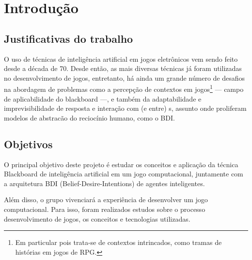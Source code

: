 \chapter{Introdução}


\section{Justificativas do trabalho}
O uso de técnicas de inteligência artificial em jogos eletrônicos vem sendo feito desde a década de 70. Desde então, as mais diversas técnicas já foram utilizadas no desenvolvimento de jogos,  entretanto, há ainda um grande número de desafios na abordagem de problemas como a percepção de contextos em jogos\footnote{Em particular pois trata-se de contextos intrincados, como tramas de histórias em jogos de RPG.} --- campo de aplicabilidade do blackboard ---, e também da adaptabilidade e imprevisibilidade de resposta e interação com (e entre) \npc{}s, assunto onde proliferam modelos de abstracão do reciocínio humano, como o BDI.

\section{Objetivos}
O principal objetivo deste projeto é estudar os conceitos e aplicação da técnica Blackboard de inteligência artificial em um jogo computacional, juntamente com a arquitetura BDI (Belief-Desire-Intentions) de agentes inteligentes. 

Além disso, o grupo vivenciará a experiência de desenvolver um jogo computacional.
Para isso, foram realizados estudos sobre o processo desenvolvimento de jogos, os conceitos e tecnologias utilizadas.